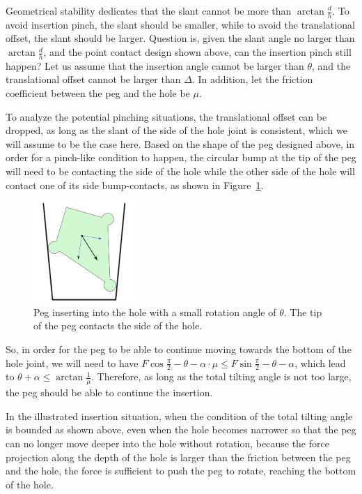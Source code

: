 \documentclass[11pt, twocolumn]{article}
\begin{document}
Geometrical stability dedicates that the slant cannot be more than $\arctan{\frac{d}{h}}$. To avoid insertion pinch, the slant should be smaller, while to avoid the translational offset, the slant should be larger. Question is, given the slant angle no larger than $\arctan{\frac{d}{h}}$, and the point contact design shown above, can the insertion pinch still happen? Let us assume that the insertion angle cannot be larger than $\theta$, and the translational offset cannot be larger than $\Delta$. In addition, let the friction coefficient between the peg and the hole be $\mu$. 

To analyze the potential pinching situations, the translational offset can be dropped, as long as the slant of the side of the hole joint is consistent, which we will assume to be the case here. Based on the shape of the peg designed above, in order for a pinch-like condition to happen, the circular bump at the tip of the peg will need to be contacting the side of the hole while the other side of the hole will contact one of its side bump-contacts, as shown in Figure~\ref{fig:tilt}. 

\begin{figure}
\begin{center}
\includegraphics[width=1.5in]{figures/tilt.png}
\end{center}
\caption{Peg inserting into the hole with a small rotation angle of $\theta$. The tip of the peg contacts the side of the hole. }
\label{fig:tilt}
\end{figure}

So, in order for the peg to be able to continue moving towards the bottom of the hole joint, we will need to have $F\cos{\frac{\pi}{2}-\theta-\alpha}\cdot\mu \leq F\sin{\frac{\pi}{2}-\theta-\alpha}$, which lead to $\theta+\alpha\leq \arctan{\frac{1}{\mu}}$. Therefore, as long as the total tilting angle is not too large, the peg should be able to continue the insertion. 

In the illustrated insertion situation, when the condition of the total tilting angle is bounded as shown above, even when the hole becomes narrower so that the peg can no longer move deeper into the hole without rotation, because the force projection along the depth of the hole is larger than the friction between the peg and the hole, the force is sufficient to push the peg to rotate, reaching the bottom of the hole. 
\end{document}
